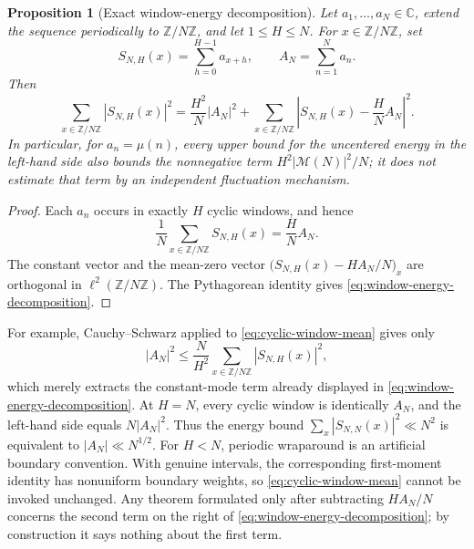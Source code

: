 \documentclass[11pt]{amsart}
\numberwithin{equation}{section}
\theoremstyle{plain}
\newtheorem{proposition}[theorem]{Proposition}
\theoremstyle{definition}
\theoremstyle{remark}
\newcommand{\Mertens}{\mathcal M}
\newcommand{\C}{\mathbb C}
\newcommand{\Z}{\mathbb Z}
\begin{document}
\begin{proposition}[Exact window-energy decomposition]
\label{prop:window-energy}
Let \(a_1,\ldots,a_N\in\C\), extend the sequence periodically to
\(\Z/N\Z\), and let \(1\leq H\leq N\).  For \(x\in\Z/N\Z\), set
\begin{equation}
  S_{N,H}(x)=\sum_{h=0}^{H-1}a_{x+h},
  \qquad
  A_N=\sum_{n=1}^{N}a_n.
  \label{eq:cyclic-window}
\end{equation}
Then
\begin{equation}
  \sum_{x\in\Z/N\Z}|S_{N,H}(x)|^2
  =\frac{H^2}{N}|A_N|^2
   +\sum_{x\in\Z/N\Z}
    \left|S_{N,H}(x)-\frac{H}{N}A_N\right|^2.
  \label{eq:window-energy-decomposition}
\end{equation}
In particular, for \(a_n=\mu(n)\), every upper bound for the uncentered
energy in the left-hand side also bounds the nonnegative term
\(H^2|\Mertens(N)|^2/N\); it does not estimate that term by an independent
fluctuation mechanism.
\end{proposition}

\begin{proof}
Each \(a_n\) occurs in exactly \(H\) cyclic windows, and hence
\begin{equation}
  \frac1N\sum_{x\in\Z/N\Z}S_{N,H}(x)=\frac{H}{N}A_N.
  \label{eq:cyclic-window-mean}
\end{equation}
The constant vector and the mean-zero vector
\(\bigl(S_{N,H}(x)-HA_N/N\bigr)_x\) are orthogonal in
\(\ell^2(\Z/N\Z)\).  The Pythagorean identity gives
\eqref{eq:window-energy-decomposition}.
\end{proof}

For example, Cauchy--Schwarz applied to
\eqref{eq:cyclic-window-mean} gives only
\begin{equation}
  |A_N|^2\leq\frac{N}{H^2}
  \sum_{x\in\Z/N\Z}|S_{N,H}(x)|^2,
  \label{eq:window-cauchy}
\end{equation}
which merely extracts the constant-mode term already displayed in
\eqref{eq:window-energy-decomposition}.  At \(H=N\), every cyclic window is
identically \(A_N\), and the left-hand side equals \(N|A_N|^2\).  Thus the
energy bound \(\sum_x|S_{N,N}(x)|^2\ll N^2\) is equivalent to
\(|A_N|\ll N^{1/2}\).  For \(H<N\), periodic wraparound is an artificial
boundary convention.  With genuine intervals, the corresponding first-moment
identity has nonuniform boundary weights, so
\eqref{eq:cyclic-window-mean} cannot be invoked unchanged.  Any theorem
formulated only after subtracting \(HA_N/N\) concerns the second term on the
right of \eqref{eq:window-energy-decomposition}; by construction it says
nothing about the first term.
\end{document}
